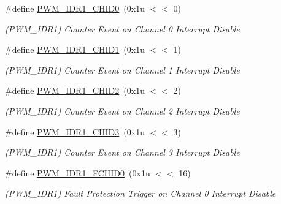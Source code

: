 \begin{DoxyCompactItemize}
\mbox{\label{group__SAMS70__PWM_gaac74a9e06fc4dd8a1c2e30bcaaa6dd17}} 
\#define \mbox{\hyperlink{group__SAMS70__PWM_gaac74a9e06fc4dd8a1c2e30bcaaa6dd17}{P\+W\+M\+\_\+\+I\+D\+R1\+\_\+\+C\+H\+I\+D0}}~(0x1u $<$$<$ 0)
\begin{DoxyCompactList}\small\item\em (P\+W\+M\+\_\+\+I\+D\+R1) Counter Event on Channel 0 Interrupt Disable \end{DoxyCompactList}\item 
\mbox{\label{group__SAMS70__PWM_ga80cc87b54b89b298d6bf32700df8cb9a}} 
\#define \mbox{\hyperlink{group__SAMS70__PWM_ga80cc87b54b89b298d6bf32700df8cb9a}{P\+W\+M\+\_\+\+I\+D\+R1\+\_\+\+C\+H\+I\+D1}}~(0x1u $<$$<$ 1)
\begin{DoxyCompactList}\small\item\em (P\+W\+M\+\_\+\+I\+D\+R1) Counter Event on Channel 1 Interrupt Disable \end{DoxyCompactList}\item 
\mbox{\label{group__SAMS70__PWM_ga668fe202fa0cdba3d8e740339740a455}} 
\#define \mbox{\hyperlink{group__SAMS70__PWM_ga668fe202fa0cdba3d8e740339740a455}{P\+W\+M\+\_\+\+I\+D\+R1\+\_\+\+C\+H\+I\+D2}}~(0x1u $<$$<$ 2)
\begin{DoxyCompactList}\small\item\em (P\+W\+M\+\_\+\+I\+D\+R1) Counter Event on Channel 2 Interrupt Disable \end{DoxyCompactList}\item 
\mbox{\label{group__SAMS70__PWM_ga5436d6d3d46e185a265960da08b61718}} 
\#define \mbox{\hyperlink{group__SAMS70__PWM_ga5436d6d3d46e185a265960da08b61718}{P\+W\+M\+\_\+\+I\+D\+R1\+\_\+\+C\+H\+I\+D3}}~(0x1u $<$$<$ 3)
\begin{DoxyCompactList}\small\item\em (P\+W\+M\+\_\+\+I\+D\+R1) Counter Event on Channel 3 Interrupt Disable \end{DoxyCompactList}\item 
\mbox{\label{group__SAMS70__PWM_ga5d0b864d7c46d711e67f258576bdb695}} 
\#define \mbox{\hyperlink{group__SAMS70__PWM_ga5d0b864d7c46d711e67f258576bdb695}{P\+W\+M\+\_\+\+I\+D\+R1\+\_\+\+F\+C\+H\+I\+D0}}~(0x1u $<$$<$ 16)
\begin{DoxyCompactList}\small\item\em (P\+W\+M\+\_\+\+I\+D\+R1) Fault Protection Trigger on Channel 0 Interrupt Disable \end{DoxyCompactList}\item 
$$
\end{DoxyCompactItemize}
